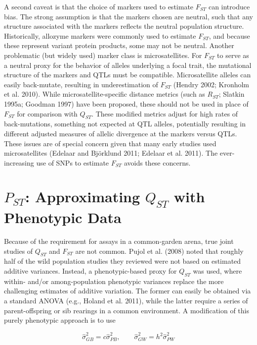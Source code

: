 \documentclass{article}
\begin{document}
A second caveat is that the choice of markers used to estimate  $ F_{ST} $ can introduce bias. The strong assumption is that the markers chosen are neutral, such that any structure associated with the markers reflects the neutral population structure. Historically, allozyme markers were commonly used to estimate  $ F_{ST} $, and because these represent variant protein products, some may not be neutral. Another problematic (but widely used) marker class is microsatellites. For  $ F_{ST} $ to serve as a neutral proxy for the behavior of alleles underlying a focal trait, the mutational structure of the markers and QTLs must be compatible. Microsatellite alleles can easily back-mutate, resulting in underestimation of  $ F_{ST} $ (Hendry 2002; Kronholm et al. 2010). While microsatellite-specific distance metrics (such as  $ R_{ST} $; Slatkin 1995a; Goodman 1997) have been proposed, these should not be used in place of  $ F_{ST} $ for comparison with  $ Q_{ST} $. These modified metrics adjust for high rates of back-mutations, something not expected at QTL alleles, potentially resulting in different adjusted measures of allelic divergence at the markers versus QTLs. These issues are of special concern given that many early studies used microsatellites (Edelaar and Björklund 2011; Edelaar et al. 2011). The ever-increasing use of SNPs to estimate  $ F_{ST} $ avoids these concerns.

\section{ $ P_{ST} $: Approximating  $ Q_{ST} $ with Phenotypic Data}
Because of the requirement for assays in a common-garden arena, true joint studies of  $ Q_{ST} $ and  $ F_{ST} $ are not common. Pujol et al. (2008) noted that roughly half of the wild population studies they reviewed were not based on estimated additive variances. Instead, a phenotypic-based proxy for  $ Q_{ST} $ was used, where within- and/or among-population phenotypic variances replace the more challenging estimates of additive variation. The former can easily be obtained via a standard ANOVA (e.g., Holand et al. 2011), while the latter require a series of parent-offspring or sib rearings in a common environment. A modification of this purely phenotypic approach is to use

\begin{equation}
\widehat{\sigma}_{G B}^{2}=c\widehat{\sigma}_{P B}^{2},\qquad\widehat{\sigma}_{G W}^{2}=h^{2}\widehat{\sigma}_{P W}^{2}
\tag{12.27a}
\label{eq:12_27a}
\end{equation}
\end{document}
